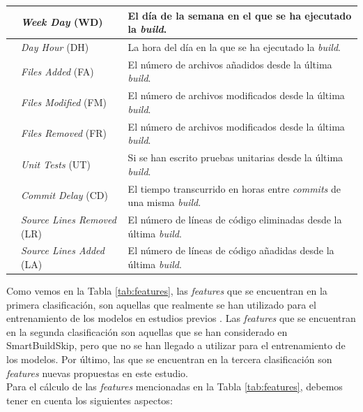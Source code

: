\begin{table}[H]
\begin{tabular}{|>{\raggedright\arraybackslash}m{3cm}|>{\raggedright\arraybackslash}m{4cm}|>{\raggedright\arraybackslash}m{7cm}|}
        \cline{2-3}
        & \textit{Week Day} (WD) & El día de la semana en el que se ha ejecutado la \textit{build}.\\
        \cline{2-3}
        & \textit{Day Hour} (DH) & La hora del día en la que se ha ejecutado la \textit{build}.\\
        \Xhline{1pt}
        \multirow{5}{=}{Nuevas consideradas en este estudio, pero no utilizadas}& \textit{Files Added} (FA) & El número de archivos añadidos desde la última \textit{build}.\\
        \cline{2-3}
        & \textit{Files Modified} (FM) & El número de archivos modificados desde la última \textit{build}.\\
        \cline{2-3}
        & \textit{Files Removed} (FR) & El número de archivos modificados desde la última \textit{build}.\\
        \cline{2-3}
        & \textit{Unit Tests} (UT) & Si se han escrito pruebas unitarias desde la última \textit{build}.\\
        \cline{2-3}
        & \textit{Commit Delay} (CD) & El tiempo transcurrido en horas entre \textit{commits} de una misma \textit{build}.\\
        \Xhline{1pt}
        \multirow{2}{=}{Nuevas consideradas y utilizadas en este estudio} & \textit{Source Lines Removed} (LR) & El número de líneas de código eliminadas desde la última \textit{build}.\\
        \cline{2-3}
        & \textit{Source Lines Added} (LA) & El número de líneas de código añadidas desde la última \textit{build}.\\        
        \hline
    \end{tabular}
\end{table}

Como vemos en la Tabla \ref{tab:features}, las \textit{features} que se encuentran en la primera
clasificación, son aquellas que realmente se han utilizado para el entrenamiento de los modelos
en estudios previos \cite{2}. Las \textit{features} que se encuentran en la segunda clasificación
son aquellas que se han considerado en SmartBuildSkip, pero que no se han llegado a utilizar para
el entrenamiento de los modelos. Por último, las que se encuentran en la tercera clasificación son
\textit{features} nuevas propuestas en este estudio.\\

\noindent Para el cálculo de las \textit{features} mencionadas en la Tabla \ref{tab:features},
debemos tener en cuenta los siguientes aspectos:

